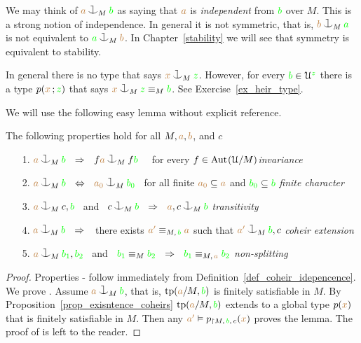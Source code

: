 We may think of ${\mr a}\cnonfork_M{\gr b}$ as saying that 
${\color{brown} a}$ is \emph{independent\/} from ${\color{green} b}$ over $M$.
This is a strong notion of independence.
In general it is not symmetric, that is, ${\mr b}\cnonfork_M{\gr a}$ is not equivalent to ${\gr a}\cnonfork_M{\mr b}$. In Chapter~\ref{stability} we will see that symmetry is equivalent to stability.

\begin{remark}
  In general there is no type that says ${\mr x}\cnonfork_M{\gr z}$.
  However, for every ${\color{green} b}\in\EuScript U^{\color{green} z}$ there is a type $p({\color{brown} x}\,;{\color{green} z})$ that says ${\mr x}\cnonfork_M{\gr z}\equiv_M{\gr b}$.
  See Exercise~\ref{ex_heir_type}.
\end{remark}

We will use the following easy lemma without explicit reference.

\begin{lemma}\label{lem_coheir_independence}
  The following properties hold for all $M,{\color{brown} a},{\color{brown} b}$, and $c$
  \begin{itemize}
  \item[1.] ${\mr a}\cnonfork_M{\gr b}\ \ \IMP\ \ f{\mr a}\cnonfork_Mf{\gr b}$ \ \ 
            for every $f\in{\rm Aut\kern.15ex}(\EuScript U/M)$\hfill \textit{invariance}
  \item[2.] ${\mr a}\cnonfork_M{\gr b}\ \ \IFF\ \ {\mr a_0}\cnonfork_M{\gr b_0}$
            \ for all finite ${\color{brown} a_0}\subseteq{\color{brown}a}$ and 
            ${\color{green} b_0}\subseteq{\color{green}b}$ \hfill\textit{finite character}
  \item[3.] ${\mr a}\cnonfork_Mc,{\gr b}$ \ and \ 
            $c\cnonfork_M{\gr b}\ \ \IMP\ \ {\mr a},c\cnonfork_M{\gr b}$
            \hfill\hfill\hfill\textit{transitivity}
  \item[4.] ${\mr a}\cnonfork_M{\gr b}\ \ \IMP\ \ $ 
            there exists ${\color{brown} a'}\equiv_{M,\,{\color{green} b}}{\color{brown} a}$ such that 
            ${\mr a'}\cnonfork_M{\gr b},c$
            \textit{coheir extension}
  \item[5.] ${\mr a}\cnonfork_M{\gr b_1},{\gr b_2}$ \ and \ 
  ${\color{green} b_1}\equiv_M{\color{green} b_2}\ \ \Rightarrow\ \ {\color{green} b_1}\equiv_{M,\,{\color{brown} a}}{\color{green} b_2}$
            \hspace{\stretch{20}}\textit{non-splitting}
  \end{itemize}
\end{lemma}
\begin{proof}
  Properties - follow immediately from Definition~\ref{def_coheir_idepencence}.
  We prove .
  Assume ${\mr a}\cnonfork_M{\gr b}$, that is, ${\rm tp}({\color{brown} a}/M,{\color{green} b})$ is finitely satisfiable in $M$.
  By Proposition~\ref{prop_exisntence_coheirs} ${\rm tp}({\color{brown} a}/M,{\color{green} b})$ extends to a global type $p({\color{brown} x})$ that is finitely satisfiable in $M$.
  Then any ${\color{brown} a'}\vDash p_{\restriction M,\,{\color{green} b},\,c}({\color{brown} x})$ proves the lemma.
  The proof of \ssf{5} is left to the reader.
\end{proof}


